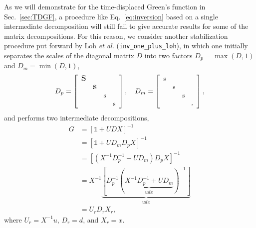 \documentclass[submission, Phys]{SciPost}
\newcommand{\stiny}{\scalebox{0.5}{s}}
\newcommand{\ssmall}{\scalebox{0.9}{s}}
\newcommand{\smedium}{\scalebox{1.3}{s}}
\newcommand{\slarge}{\scalebox{1.7}{s}}
\newcommand{\Dp}{\left[
	\begin{array}{cccc}
		\slarge &  &  &  \\
		& \smedium &  &  \\
		&  & \ssmall &  \\
		&  &  & \ssmall \\
	\end{array}
	\right]}
\newcommand{\Dm}{\left[
	\begin{array}{cccc}
		\ssmall &  &  &  \\
		& \ssmall &  &  \\
		&  & \ssmall &  \\
		&  &  & \stiny \\
	\end{array}
	\right]}
\begin{document}
As we will demonstrate for the time-displaced Green's function in Sec.~\ref{sec:TDGF}, a procedure like Eq.~\eqref{eq:inversion} based on a single intermediate decomposition will still fail to give accurate results for some of the matrix decompositions. For this reason, we consider another stabilization procedure put forward by Loh \textit{et al.} \cite{Loh2005, Loh1989} (\texttt{inv\_one\_plus\_loh}), in which one initially separates the scales of the diagonal matrix $D$ into two factors $D_p = \max(D, 1)$ and $D_m = \min(D, 1)$,
\begin{align}
D_p = \Dp, \quad D_m = \Dm,
\end{align}
and performs two intermediate decompositions,
\begin{align}
	G &= [\mathbb{1} + UDX]^{-1} \nonumber\\
	&= [\mathbb{1} + UD_mD_pX]^{-1} \nonumber\\
	&= [(X^{-1} D_p^{-1} + U D_m) D_p X]^{-1} \label{eq:inversion_loh} \\
	&= X^{-1} \underbrace{[D_p^{-1} (\underbrace{X^{-1} D_p^{-1} + UD_m}_{udx})^{-1}]}_{udx} \nonumber \\
	&= U_r D_r X_r, \nonumber
\end{align}
where $U_r = X^{-1}u$, $D_r = d$, and $X_r = x$.
\end{document}
